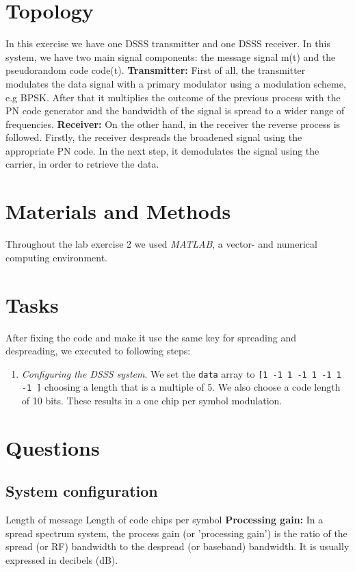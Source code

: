 \documentclass[12pt,a4paper]{article}
\begin{document}
	\section{Topology}
	In this exercise we have one DSSS transmitter and one DSSS receiver. In this system, we have two main signal components: the message signal m(t) and the pseudorandom code code(t). \newline
	\textbf{Transmitter:} First of all, the transmitter modulates the data signal with a primary modulator using a modulation scheme, e.g BPSK. After that it multiplies the outcome of the previous process with the PN code generator and the bandwidth of the signal is spread to a wider range of frequencies.
	\newline
	\textbf{Receiver:} On the other hand, in the receiver the reverse process is followed. Firstly, the receiver despreads the broadened signal using the appropriate PN code. In the next step, it demodulates the signal using the carrier, in order to retrieve the data.
	
	\section{Materials and Methods}
	Throughout the lab exercise 2 we used \emph{MATLAB}, a vector- and numerical computing environment.
		
	\section{Tasks}
		After fixing the code and make it use the same key for spreading and despreading, we executed to following steps:
		\begin{enumerate}
			\item \emph{Configuring the DSSS system}. We set the \texttt{data} array to \texttt{[1 -1 1 -1 1 -1 1 -1 ]} choosing a length that is a multiple of 5. We also choose a code length of 10 bits. These results in a one chip per symbol modulation.
			
			
		\end{enumerate}
	
	\section{Questions}
		\subsection{System configuration}
			Length of message
			Length of code
			chips per symbol \newline
			\textbf{Processing gain:} In a spread spectrum system, the process gain (or 'processing gain') is the ratio of the spread (or RF) bandwidth to the despread (or baseband) bandwidth. It is usually expressed in decibels (dB).
			
\end{document}
